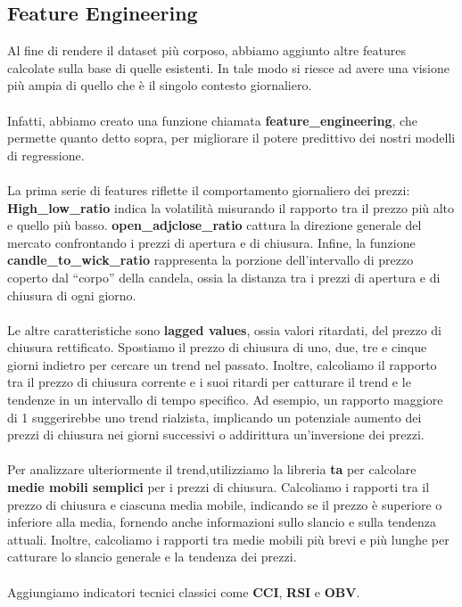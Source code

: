 \documentclass{article}
\begin{document}
\subsection{Feature Engineering}
Al fine di rendere il dataset più corposo, abbiamo aggiunto altre features calcolate sulla base di quelle esistenti. In tale modo si riesce ad avere una visione più ampia di quello che è il singolo contesto giornaliero. \\ \\
Infatti, abbiamo creato una funzione chiamata \textbf{feature\_engineering}, che permette quanto detto sopra, per migliorare il potere predittivo dei nostri modelli di regressione. \\ \\
La prima serie di features riflette il comportamento giornaliero dei prezzi: \textbf{High\_low\_ratio} indica la volatilità misurando il rapporto tra il prezzo più alto e quello più basso. \textbf{open\_adjclose\_ratio} cattura la direzione generale del mercato confrontando i prezzi di apertura e di chiusura. Infine, la funzione \textbf{candle\_to\_wick\_ratio} rappresenta la porzione dell'intervallo di prezzo coperto dal “corpo” della candela, ossia la distanza tra i prezzi di apertura e di chiusura di ogni giorno.\\ \\
Le altre caratteristiche sono \textbf{lagged values}, ossia valori ritardati, del prezzo di chiusura rettificato. Spostiamo il prezzo di chiusura di uno, due, tre e cinque giorni indietro per cercare un trend nel passato. Inoltre, calcoliamo il rapporto tra il prezzo di chiusura corrente e i suoi ritardi per catturare il trend e le tendenze in un intervallo di tempo specifico. Ad esempio, un rapporto maggiore di 1 suggerirebbe uno trend rialzista, implicando un potenziale aumento dei prezzi di chiusura nei giorni successivi o addirittura un’inversione dei prezzi. \\ \\
Per analizzare ulteriormente il trend,utilizziamo la libreria \textbf{ta} per calcolare \textbf{medie mobili semplici} per i prezzi di chiusura. Calcoliamo i rapporti tra il prezzo di chiusura e ciascuna media mobile, indicando se il prezzo è superiore o inferiore alla media, fornendo anche informazioni sullo slancio e sulla tendenza attuali. Inoltre, calcoliamo i rapporti tra medie mobili più brevi e più lunghe per catturare lo slancio generale e la tendenza dei prezzi. \\ \\
Aggiungiamo indicatori tecnici classici come \textbf{CCI}, \textbf{RSI} e \textbf{OBV}. 
\end{document}
